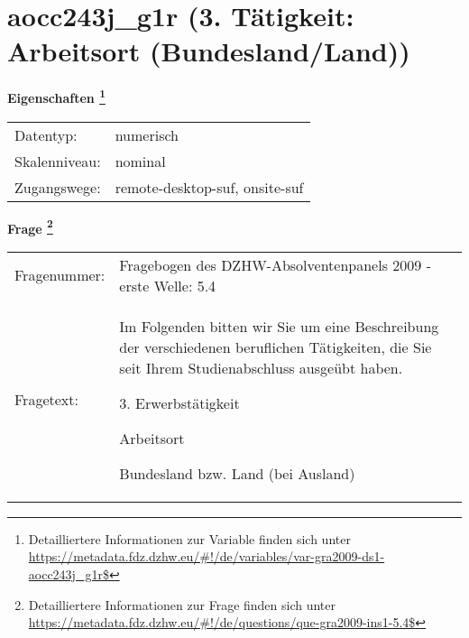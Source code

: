 
    \setcounter{footnote}{0}

    \vspace*{-1.8cm}
	\section{aocc243j\_g1r (3. Tätigkeit: Arbeitsort (Bundesland/Land))}
	\label{section:aocc243j_g1r}



    \vspace*{0.5cm}
    \noindent\textbf{Eigenschaften
	\footnote{Detailliertere Informationen zur Variable finden sich unter
		\url{https://metadata.fdz.dzhw.eu/\#!/de/variables/var-gra2009-ds1-aocc243j_g1r$}}}\\
	\begin{tabularx}{\hsize}{@{}lX}
	Datentyp: & numerisch \\
	Skalenniveau: & nominal \\
	Zugangswege: &
	  remote-desktop-suf, 
	  onsite-suf
 \\
    \end{tabularx}



				\vspace*{0.5cm}
                \noindent\textbf{Frage
	                \footnote{Detailliertere Informationen zur Frage finden sich unter
		              \url{https://metadata.fdz.dzhw.eu/\#!/de/questions/que-gra2009-ins1-5.4$}}}\\
				\begin{tabularx}{\hsize}{@{}lX}
					Fragenummer: &
					  Fragebogen des DZHW-Absolventenpanels 2009 - erste Welle:
					  5.4
 \\
					Fragetext: & Im Folgenden bitten wir Sie um eine Beschreibung der verschiedenen beruflichen Tätigkeiten, die Sie seit Ihrem Studienabschluss ausgeübt haben.\par  3. Erwerbstätigkeit\par  Arbeitsort\par  Bundesland bzw. Land (bei Ausland) \\
				\end{tabularx}





